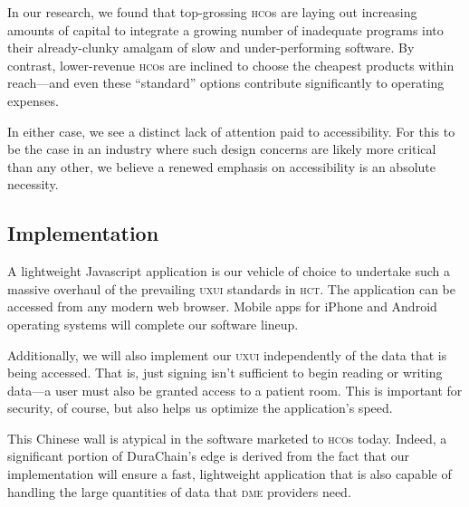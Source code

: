 In our research, we found that top-grossing \textsc{hco}s are laying out increasing amounts of capital to integrate a growing number of inadequate programs into their already-clunky amalgam of slow and under-performing software. By contrast, lower-revenue \textsc{hco}s are inclined to choose the cheapest products within reach---and even these ``standard'' options contribute significantly to operating expenses.%

In either case, we see a distinct lack of attention paid to accessibility. For this to be the case in an industry where such design concerns are likely more critical than any other, we believe a renewed emphasis on accessibility is an absolute necessity.%

\subsection{Implementation}
A lightweight Javascript application is our vehicle of choice to undertake such a massive overhaul of the prevailing \textsc{uxui} standards in \textsc{hct}. The application can be accessed from any modern web browser. Mobile apps for iPhone and Android operating systems will complete our software lineup.%

Additionally, we will also implement our \textsc{uxui} independently of the data that is being accessed. That is, just signing isn't sufficient to begin reading or writing data---a user must also be granted access to a patient room. This is important for security, of course, but also helps us optimize the application's speed.%

This Chinese wall is atypical in the software marketed to \textsc{hco}s today. Indeed, a significant portion of DuraChain's edge is derived from the fact that our implementation will ensure a fast, lightweight application that is also capable of handling the large quantities of data that \textsc{dme} providers need.%
